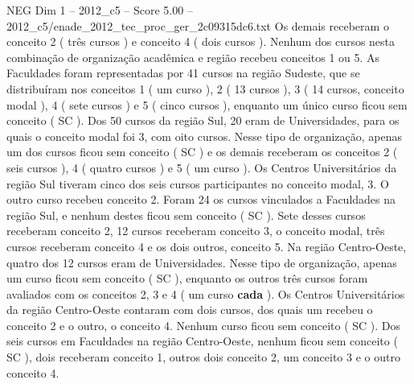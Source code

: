 \begin{textsample}{NEG Dim 1 – 2012\_c5 – Score 5.00 – 2012\_c5/enade\_2012\_tec\_proc\_ger\_2c09315dc6.txt}
Os demais receberam o conceito 2 ( três cursos ) e conceito 4 ( dois cursos ).
Nenhum dos cursos nesta combinação de organização acadêmica e região recebeu conceitos 1 ou 5.
As Faculdades foram representadas por 41 cursos na região Sudeste, que se distribuíram nos conceitos 1 ( um curso ), 2 ( 13 cursos ), 3 ( 14 cursos, conceito modal ), 4 ( sete cursos ) e 5 ( cinco cursos ), enquanto um único curso ficou sem conceito ( SC ).
Dos 50 cursos da região Sul, 20 eram de Universidades, para os quais o conceito modal foi 3, com oito cursos.
Nesse tipo de organização, apenas um dos cursos ficou sem conceito ( SC ) e os demais receberam os conceitos 2 ( seis cursos ), 4 ( quatro cursos ) e 5 ( um curso ).
Os Centros Universitários da região Sul tiveram cinco dos seis cursos participantes no conceito modal, 3.
O outro curso recebeu conceito 2.
Foram 24 os cursos vinculados a Faculdades na região Sul, e nenhum destes ficou sem conceito ( SC ).
Sete desses cursos receberam conceito 2, 12 cursos receberam conceito 3, o conceito modal, três cursos receberam conceito 4 e os dois outros, conceito 5.
Na região Centro-Oeste, quatro dos 12 cursos eram de Universidades.
Nesse tipo de organização, apenas um curso ficou sem conceito ( SC ), enquanto os outros três cursos foram avaliados com os conceitos 2, 3 e 4 ( um curso \textbf{cada} ).
Os Centros Universitários da região Centro-Oeste contaram com dois cursos, dos quais um recebeu o conceito 2 e o outro, o conceito 4.
Nenhum curso ficou sem conceito ( SC ).
Dos seis cursos em Faculdades na região Centro-Oeste, nenhum ficou sem conceito ( SC ), dois receberam conceito 1, outros dois conceito 2, um conceito 3 e o outro conceito 4.

\end{textsample}
